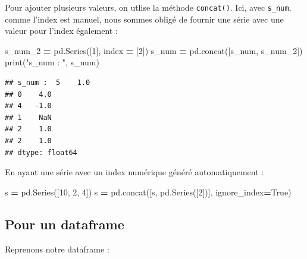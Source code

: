 \documentclass[
  12pt,
]{book}
\newenvironment{Shaded}{\begin{snugshade}}{\end{snugshade}}
\newcommand{\BuiltInTok}[1]{#1}
\newcommand{\DecValTok}[1]{\textcolor[rgb]{0.00,0.00,0.81}{#1}}
\newcommand{\NormalTok}[1]{#1}
\newcommand{\OperatorTok}[1]{\textcolor[rgb]{0.81,0.36,0.00}{\textbf{#1}}}
\newcommand{\StringTok}[1]{\textcolor[rgb]{0.31,0.60,0.02}{#1}}
\newcommand{\VariableTok}[1]{\textcolor[rgb]{0.00,0.00,0.00}{#1}}
\numberwithin{equation}{section}
\numberwithin{countremarque}{section}
\begin{document}
Pour ajouter plusieurs valeurs, on utlise la méthode \texttt{concat()}. Ici, avec \texttt{s\_num}, comme l'index est manuel, nous sommes obligé de fournir une série avec une valeur pour l'index également :

\begin{Shaded}
\begin{Highlighting}[]
\NormalTok{s\_num\_2 }\OperatorTok{=}\NormalTok{ pd.Series([}\DecValTok{1}\NormalTok{], index }\OperatorTok{=}\NormalTok{ [}\DecValTok{2}\NormalTok{])}
\NormalTok{s\_num }\OperatorTok{=}\NormalTok{ pd.concat([s\_num, s\_num\_2])}
\BuiltInTok{print}\NormalTok{(}\StringTok{"s\_num : "}\NormalTok{, s\_num)}
\end{Highlighting}
\end{Shaded}

\begin{lstlisting}
## s_num :  5    1.0
## 0    4.0
## 4   -1.0
## 1    NaN
## 2    1.0
## 2    1.0
## dtype: float64
\end{lstlisting}

En ayant une série avec un index numérique généré automatiquement :

\begin{Shaded}
\begin{Highlighting}[]
\NormalTok{s }\OperatorTok{=}\NormalTok{ pd.Series([}\DecValTok{10}\NormalTok{, }\DecValTok{2}\NormalTok{, }\DecValTok{4}\NormalTok{])}
\NormalTok{s }\OperatorTok{=}\NormalTok{ pd.concat([s, pd.Series([}\DecValTok{2}\NormalTok{])], ignore\_index}\OperatorTok{=}\VariableTok{True}\NormalTok{)}
\end{Highlighting}
\end{Shaded}

\subsection{Pour un dataframe}\label{pour-un-dataframe-1}

Reprenons notre dataframe :
\end{document}
